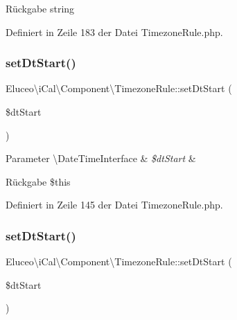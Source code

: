 \begin{DoxyReturn}{Rückgabe}
string 
\end{DoxyReturn}


Definiert in Zeile 183 der Datei Timezone\+Rule.\+php.

\mbox{\label{class_eluceo_1_1i_cal_1_1_component_1_1_timezone_rule_a161d33d5128049a75e78280467ff9347}} 
\subsubsection{\texorpdfstring{set\+Dt\+Start()}{setDtStart()}\hspace{0.1cm}{\footnotesize\ttfamily [1/3]}}
{\footnotesize\ttfamily Eluceo\textbackslash{}i\+Cal\textbackslash{}\+Component\textbackslash{}\+Timezone\+Rule\+::set\+Dt\+Start (\begin{DoxyParamCaption}\item[{\textbackslash{}Date\+Time\+Interface}]{\$dt\+Start }\end{DoxyParamCaption})}


\begin{DoxyParams}[1]{Parameter}
\textbackslash{}\+Date\+Time\+Interface & {\em \$dt\+Start} & \\
\hline
\end{DoxyParams}
\begin{DoxyReturn}{Rückgabe}
\$this 
\end{DoxyReturn}


Definiert in Zeile 145 der Datei Timezone\+Rule.\+php.

\mbox{\label{class_eluceo_1_1i_cal_1_1_component_1_1_timezone_rule_a161d33d5128049a75e78280467ff9347}} 
\subsubsection{\texorpdfstring{set\+Dt\+Start()}{setDtStart()}\hspace{0.1cm}{\footnotesize\ttfamily [2/3]}}
{\footnotesize\ttfamily Eluceo\textbackslash{}i\+Cal\textbackslash{}\+Component\textbackslash{}\+Timezone\+Rule\+::set\+Dt\+Start (\begin{DoxyParamCaption}\item[{\textbackslash{}Date\+Time\+Interface}]{\$dt\+Start }\end{DoxyParamCaption})}


